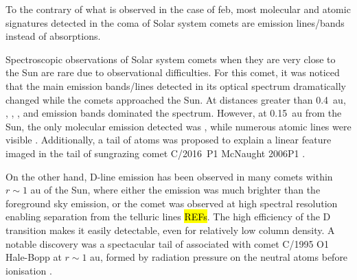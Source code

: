 \documentclass{aa}
\begin{document}
To the contrary of what is observed in the case of \ac{feb}, most molecular and atomic signatures detected in the coma of Solar system comets are emission lines/bands instead of absorptions.

Spectroscopic observations of Solar system comets when they are very close to the Sun are rare due to observational difficulties.
%
%
%
%
For this comet, it was noticed that the main emission bands/lines detected in its optical spectrum dramatically changed while the comets approached the Sun.
%
At distances greater than 0.4~au, , , , and  emission bands dominated the spectrum.
%
However, at 0.15~au from the Sun, the only molecular emission detected was , while numerous atomic lines were visible \citep[, , , , , , , , , ; ][]{Dufay65,Thackeray1966,Preston1967,Slaughter1969}.
%
Additionally, a tail of  atoms was proposed to explain a linear feature imaged in the tail of sungrazing comet C/2016~P1 McNaught 2006P1 \citep{Fulle2007}. 

On the other hand,  D-line emission has been observed in many comets within $r \sim 1$ au of the Sun, where either the emission was much brighter than the foreground sky emission, or the comet was observed at high spectral resolution enabling separation from the telluric lines \hl{REFs}.
%
The high efficiency of the  D transition makes it easily detectable, even for relatively low column density.
%
A notable discovery was a spectacular tail of  associated with comet C/1995 O1 Hale-Bopp at $r\sim 1$ au, formed by radiation pressure on the neutral atoms before ionisation \citep{Cremonese1997}. 
\end{document}
